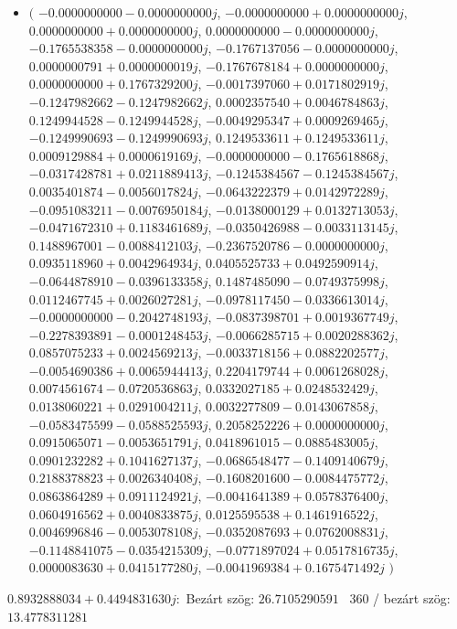 \documentclass[14pt,a4paper]{article}
\begin{document}
\begin{itemize}
\item
$\big($
$-0.0000000000-0.0000000000j$, $-0.0000000000+0.0000000000j$, $0.0000000000+0.0000000000j$, $0.0000000000-0.0000000000j$, $-0.1765538358-0.0000000000j$, $-0.1767137056-0.0000000000j$, $0.0000000791+0.0000000019j$, $-0.1767678184+0.0000000000j$, $0.0000000000+0.1767329200j$, $-0.0017397060+0.0171802919j$, $-0.1247982662-0.1247982662j$, $0.0002357540+0.0046784863j$, $0.1249944528-0.1249944528j$, $-0.0049295347+0.0009269465j$, $-0.1249990693-0.1249990693j$, $0.1249533611+0.1249533611j$, $0.0009129884+0.0000619169j$, $-0.0000000000-0.1765618868j$, $-0.0317428781+0.0211889413j$, $-0.1245384567-0.1245384567j$, $0.0035401874-0.0056017824j$, $-0.0643222379+0.0142972289j$, $-0.0951083211-0.0076950184j$, $-0.0138000129+0.0132713053j$, $-0.0471672310+0.1183461689j$, $-0.0350426988-0.0033113145j$, $0.1488967001-0.0088412103j$, $-0.2367520786-0.0000000000j$, $0.0935118960+0.0042964934j$, $0.0405525733+0.0492590914j$, $-0.0644878910-0.0396133358j$, $0.1487485090-0.0749375998j$, $0.0112467745+0.0026027281j$, $-0.0978117450-0.0336613014j$, $-0.0000000000-0.2042748193j$, $-0.0837398701+0.0019367749j$, $-0.2278393891-0.0001248453j$, $-0.0066285715+0.0020288362j$, $0.0857075233+0.0024569213j$, $-0.0033718156+0.0882202577j$, $-0.0054690386+0.0065944413j$, $0.2204179744+0.0061268028j$, $0.0074561674-0.0720536863j$, $0.0332027185+0.0248532429j$, $0.0138060221+0.0291004211j$, $0.0032277809-0.0143067858j$, $-0.0583475599-0.0588525593j$, $0.2058252226+0.0000000000j$, $0.0915065071-0.0053651791j$, $0.0418961015-0.0885483005j$, $0.0901232282+0.1041627137j$, $-0.0686548477-0.1409140679j$, $0.2188378823+0.0026340408j$, $-0.1608201600-0.0084475772j$, $0.0863864289+0.0911124921j$, $-0.0041641389+0.0578376400j$, $0.0604916562+0.0040833875j$, $0.0125595538+0.1461916522j$, $0.0046996846-0.0053078108j$, $-0.0352087693+0.0762008831j$, $-0.1148841075-0.0354215309j$, $-0.0771897024+0.0517816735j$, $0.0000083630+0.0415177280j$, $-0.0041969384+0.1675471492j$
$\big)$
\end{itemize}
$0.8932888034+0.4494831630j$:\
Bezárt szög: $26.7105290591$ \
360 / bezárt szög: $13.4778311281$\
\end{document}
